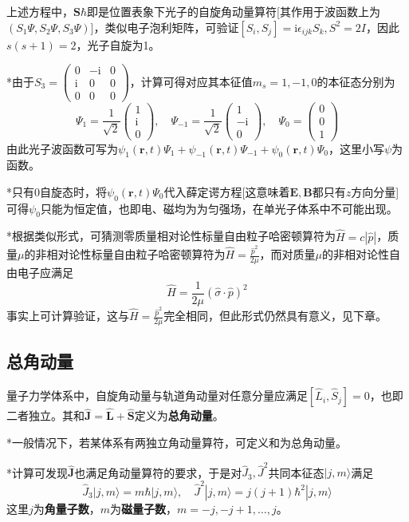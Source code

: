 \documentclass[a4paper,UTF8,fontset=windows]{ctexart}
\newcommand*{\ir}{\mathrm{i}}
\newcommand*{\ket}[1]{|#1\rangle}
\newcommand*{\br}{\mathbf{r}}
\newcommand*{\bj}{\mathbf{J}}
\newcommand*{\bl}{\mathbf{L}}
\begin{document}
上述方程中，$\mathbf{S}\hbar$即是位置表象下光子的自旋角动量算符[其作用于波函数上为$(S_1\Psi,S_2\Psi,S_3\Psi)$]，类似电子泡利矩阵，可验证$[S_i,S_j]=\ir\epsilon_{ijk}S_k,S^2=2I$，因此$s(s+1)=2$，光子自旋为1。

*由于$S_3=\begin{pmatrix}0&-\ir&0\\\ir&0&0\\0&0&0\end{pmatrix}$，计算可得对应其本征值$m_s=1,-1,0$的本征态分别为
$$\Psi_1=\frac{1}{\sqrt2}\begin{pmatrix}1\\\ir\\0\end{pmatrix},\quad\Psi_{-1}=\frac{1}{\sqrt2}\begin{pmatrix}1\\-\ir\\0\end{pmatrix},\quad\Psi_0=\begin{pmatrix}0\\0\\1\end{pmatrix}$$
由此光子波函数可写为$\psi_1(\br,t)\Psi_1+\psi_{-1}(\br,t)\Psi_{-1}+\psi_0(\br,t)\Psi_0$，这里小写$\psi$为函数。

*只有0自旋态时，将$\psi_0(\br,t)\Psi_0$代入薛定谔方程[这意味着$\mathbf{E},\mathbf{B}$都只有$z$方向分量]可得$\psi_0$只能为恒定值，也即电、磁均为为匀强场，在单光子体系中不可能出现。

*根据类似形式，可猜测零质量相对论性标量自由粒子哈密顿算符为$\hat{H}=c|\hat{p}|$，质量$\mu$的非相对论性标量自由粒子哈密顿算符为$\hat{H}=\frac{\hat{p}^2}{2\mu}$，而对质量$\mu$的非相对论性自由电子应满足
$$\hat{H}=\frac{1}{2\mu}(\hat{\sigma}\cdot\hat{p})^2$$
事实上可计算验证，这与$\hat{H}=\frac{\hat{p}^2}{2\mu}$完全相同，但此形式仍然具有意义，见下章。

\subsection{总角动量}
量子力学体系中，自旋角动量与轨道角动量对任意分量应满足$[\hat{L}_i,\hat{S}_j]=0$，也即二者独立。其和$\hat{\bj}=\hat{\bl}+\hat{\mathbf{S}}$定义为\textbf{总角动量}。

*一般情况下，若某体系有两独立角动量算符，可定义和为总角动量。

*计算可发现$\hat{\bj}$也满足角动量算符的要求，于是对$\hat{J}_3,\hat{J}^2$共同本征态$\ket{j,m}$满足
$$\hat{J}_3\ket{j,m}=m\hbar\ket{j,m},\quad\hat{J}^2\ket{j,m}=j(j+1)\hbar^2\ket{j,m}$$
这里$j$为\textbf{角量子数}，$m$为\textbf{磁量子数}，$m=-j,-j+1,\dots,j$。
\end{document}

